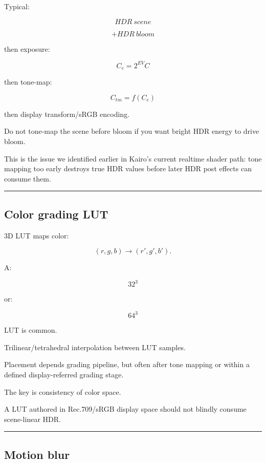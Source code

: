 Typical:

\[
HDR\ scene
\]

\[
+
HDR\ bloom
\]

then exposure:

\[
C_e=
2^{EV}C
\]

then tone-map:

\[
C_{tm}=f(C_e)
\]

then display transform/sRGB encoding.

Do not tone-map the scene before bloom if you want bright HDR energy to drive bloom.

This is the issue we identified earlier in Kairo's current realtime shader path: tone mapping too early destroys true HDR values before later HDR post effects can consume them.

\begin{center}\rule{0.5\linewidth}{0.5pt}\end{center}

\subsection{Color grading LUT}\label{04-visual-computing-ii-ch040-color-grading-lut}

\hypertarget{04-visual-computing-ii-ch040-color-grading-lut}{}

3D LUT maps color:

\[
(r,g,b)
\rightarrow
(r',g',b').
\]

A:

\[
32^3
\]

or:

\[
64^3
\]

LUT is common.

Trilinear/tetrahedral interpolation between LUT samples.

Placement depends grading pipeline, but often after tone mapping or within a defined display-referred grading stage.

The key is consistency of color space.

A LUT authored in Rec.709/sRGB display space should not blindly consume scene-linear HDR.

\begin{center}\rule{0.5\linewidth}{0.5pt}\end{center}

\subsection{Motion blur}\label{04-visual-computing-ii-ch040-motion-blur}


